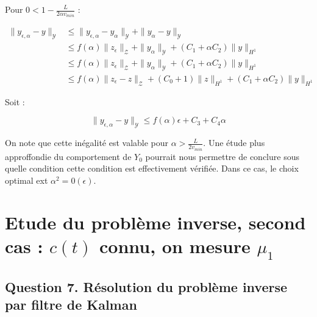 \documentclass[a4paper]{article}
\newcommand{\Y}{\mathscr{Y}}
\newcommand{\Z}{\mathscr{Z}}
\newcommand{\yea}{y_{\epsilon, \alpha}}
\begin{document}
Pour $0< 1-\displaystyle \frac{L}{2\alpha v_{min}} $ :

\[
\begin{split}
	\| \yea - y \|_{\Y} & \leq \| \yea - y_\alpha \|_{\Y} + \| y_\alpha - y \|_{\Y}\\ 	                                             & \leq f(\alpha) \| z_\epsilon \|_{\Z} 
	                          + \| y_\alpha \|_{\Y} + (C_1 + \alpha C_2) \| y \|_{H^1}\\
	                    & \leq f(\alpha) \| z_\epsilon \|_{\Z} + \| y_\alpha \|_{\Y} 
						      + (C_1 + \alpha C_2) \| y \|_{H^1}\\
	  	              & \leq f(\alpha) \| z_\epsilon - z \|_{\Z} 
					         + (C_0 +1) \| z \|_{H^1} 
	  						 + (C_1 + \alpha C_2) \| y \|_{H^1}
\end{split}
\]

Soit :

\[ \| \yea - y \|_{\Y} \leq f(\alpha) \epsilon + C_3 +C_4 \alpha \]

On note que cette inégalité est valable pour $\alpha > \displaystyle \frac{L}{2 v_{min}}$.
Une étude plus approffondie du comportement de $Y_0$ pourrait nous permettre de conclure sous quelle condition cette condition est effectivement vérifiée.
Dans ce cas, le choix optimal ext $\alpha^2 = 0(\epsilon)$.



\section{Etude du problème inverse, second cas : $c(t)$ connu, on mesure $\mu_1$}

				
\subsection*{Question 7. Résolution du problème inverse par filtre de Kalman}
	
\end{document}
